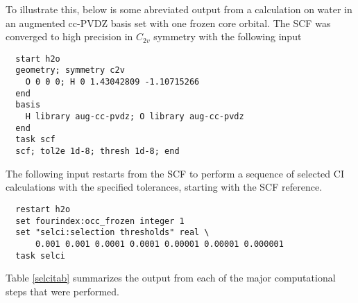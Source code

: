 To illustrate this, below is some abreviated output from a
calculation on water in an augmented cc-PVDZ basis set with one frozen
core orbital.  The SCF was converged to high precision in $C_{2v}$
symmetry with the following input
\begin{verbatim}
  start h2o
  geometry; symmetry c2v
    O 0 0 0; H 0 1.43042809 -1.10715266
  end
  basis
    H library aug-cc-pvdz; O library aug-cc-pvdz
  end
  task scf
  scf; tol2e 1d-8; thresh 1d-8; end
\end{verbatim}

The following input restarts from the SCF to perform a sequence of
selected CI calculations with the specified tolerances, starting with
the SCF reference.
\begin{verbatim}
  restart h2o
  set fourindex:occ_frozen integer 1
  set "selci:selection thresholds" real \
      0.001 0.001 0.0001 0.0001 0.00001 0.00001 0.000001
  task selci
\end{verbatim}
Table \ref{selcitab} summarizes the output from each of the major
computational steps that were performed.
